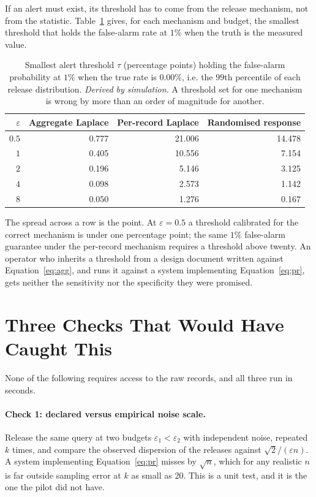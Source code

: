 \documentclass[journal]{IEEEtran}
\theoremstyle{definition}
\newcommand{\Truerate}{0.00}
\begin{document}
If an alert must exist, its threshold has to come from the release mechanism, not
from the statistic. Table~\ref{tab:thresholds} gives, for each mechanism and
budget, the smallest threshold that holds the false-alarm rate at $1\%$ when the
truth is the measured value.

\begin{table}[t]
\centering
\caption{Smallest alert threshold $\tau$ (percentage points) holding the
false-alarm probability at $1\%$ when the true rate is \Truerate\%, i.e. the
$99$th percentile of each release distribution. \emph{Derived by simulation.} A
threshold set for one mechanism is wrong by more than an order of magnitude for
another.}
\label{tab:thresholds}
\small
\setlength{\tabcolsep}{4pt}
\begin{tabular}{rrrr}
\toprule
$\varepsilon$ & Aggregate Laplace & Per-record Laplace & Randomised response \\
\midrule
$0.5$ & 0.777 & 21.006 & 14.478 \\
$1$ & 0.405 & 10.556 & 7.154 \\
$2$ & 0.196 & 5.146 & 3.125 \\
$4$ & 0.098 & 2.573 & 1.142 \\
$8$ & 0.050 & 1.276 & 0.167 \\
\bottomrule
\end{tabular}
\end{table}

The spread across a row is the point. At $\varepsilon=0.5$ a threshold
calibrated for the correct mechanism is under one percentage point; the same
$1\%$ false-alarm guarantee under the per-record mechanism requires a threshold
above twenty. An operator who inherits a threshold from a design document written
against Equation~\eqref{eq:agg}, and runs it against a system implementing
Equation~\eqref{eq:pr}, gets neither the sensitivity nor the specificity they
were promised.

\section{Three Checks That Would Have Caught This}
\label{sec:checks}

None of the following requires access to the raw records, and all three run in
seconds.

\paragraph{Check 1: declared versus empirical noise scale.}
Release the same query at two budgets $\varepsilon_1 < \varepsilon_2$ with
independent noise, repeated $k$ times, and compare the observed dispersion of the
releases against $\sqrt{2}/(\varepsilon n)$. A system implementing
Equation~\eqref{eq:pr} misses by $\sqrt{n}$, which for any realistic $n$ is far
outside sampling error at $k$ as small as $20$. This is a unit test, and it is
the one the pilot did not have.
\end{document}
